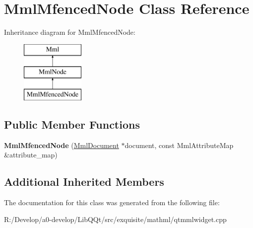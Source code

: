 \hypertarget{class_mml_mfenced_node}{}\section{Mml\+Mfenced\+Node Class Reference}
\label{class_mml_mfenced_node}
Inheritance diagram for Mml\+Mfenced\+Node\+:\begin{figure}[H]
\begin{center}
\leavevmode
\includegraphics[height=3.000000cm]{class_mml_mfenced_node}
\end{center}
\end{figure}
\subsection*{Public Member Functions}
\begin{DoxyCompactItemize}
\item 
\mbox{\label{class_mml_mfenced_node_ae196098fc2747dbfb9eab70f0fd6fc21}} 
{\bfseries Mml\+Mfenced\+Node} (\mbox{\hyperlink{class_mml_document}{Mml\+Document}} $\ast$document, const Mml\+Attribute\+Map \&attribute\+\_\+map)
\end{DoxyCompactItemize}
\subsection*{Additional Inherited Members}


The documentation for this class was generated from the following file\+:\begin{DoxyCompactItemize}
\item 
R\+:/\+Develop/a0-\/develop/\+Lib\+Q\+Qt/src/exquisite/mathml/qtmmlwidget.\+cpp\end{DoxyCompactItemize}
